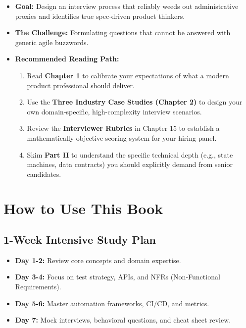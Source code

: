 \begin{itemize}
\tightlist
\item
  \textbf{Goal:} Design an interview process that reliably weeds out
  administrative proxies and identifies true spec-driven product
  thinkers.
\item
  \textbf{The Challenge:} Formulating questions that cannot be answered
  with generic agile buzzwords.
\item
  \textbf{Recommended Reading Path:}

  \begin{enumerate}
  \def\labelenumi{\arabic{enumi}.}
  \tightlist
  \item
    Read \textbf{Chapter 1} to calibrate your expectations of what a
    modern product professional should deliver.
  \item
    Use the \textbf{Three Industry Case Studies (Chapter 2)} to design
    your own domain-specific, high-complexity interview scenarios.
  \item
    Review the \textbf{Interviewer Rubrics} in Chapter 15 to establish a
    mathematically objective scoring system for your hiring panel.
  \item
    Skim \textbf{Part II} to understand the specific technical depth
    (e.g., state machines, data contracts) you should explicitly demand
    from senior candidates.
  \end{enumerate}
\end{itemize}

\section{How to Use This Book}\label{how-to-use-this-book}

\subsection{1-Week Intensive Study
Plan}\label{week-intensive-study-plan}

\begin{itemize}
\tightlist
\item
  \textbf{Day 1-2:} Review core concepts and domain expertise.
\item
  \textbf{Day 3-4:} Focus on test strategy, APIs, and NFRs
  (Non-Functional Requirements).
\item
  \textbf{Day 5-6:} Master automation frameworks, CI/CD, and metrics.
\item
  \textbf{Day 7:} Mock interviews, behavioral questions, and cheat sheet
  review.
\end{itemize}

